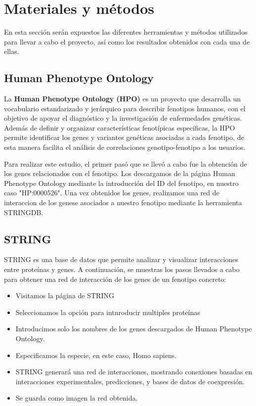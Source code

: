 \section{Materiales y métodos}

En esta sección serán expuestos las diferentes herramientas y métodos utilizados para llevar a cabo el proyecto, así como los resultados obtenidos con cada una de ellas.

\subsection{Human Phenotype Ontology}

La \textbf{Human Phenotype Ontology (HPO)} es un proyecto que desarrolla un vocabulario estandarizado y jerárquico para describir fenotipos humanos, con el objetivo de apoyar el diagnóstico y la investigación de enfermedades genéticas. Además de definir y organizar características fenotípicas específicas, la HPO permite identificar los genes y variantes genéticas asociadas a cada fenotipo, de esta manera facilita el análisis de correlaciones genotipo-fenotipo a los usuarios.

Para realizar este estudio, el primer pasó que se llevó a cabo fue la obtención de los genes relacionados con el fenotipo. Los descargamos de la página Human Phenotype Ontology mediante la introducción del ID del fenotipo, en nuestro caso "HP:0000526". Una vez obtenidos los genes, realizamos una red de interaccion de los genese asociados a nuestro fenotipo mediante la herramienta STRINGDB.
 

\subsection{STRING}


STRING es una base de datos que permite analizar y visualizar interacciones entre proteínas y genes. A continuación, se muestras los pasos llevados a cabo para obtener una red de interacción de los genes de un fenotipo concreto:

\begin{itemize}
	\item Visitamos la página de STRING
	\item Seleccionamos la opción para intnroducir multiples proteínas
	\item Introducimos solo los nombres de los genes descargados de Human Phenotype Ontology.
	\item Especificamos la especie, en este caso, Homo sapiens.
	\item STRING generará una red de interacciones, mostrando conexiones basadas en interacciones experimentales, predicciones, y bases de datos de coexpresión.
	\item Se guarda como imagen la red obtenida.
\end{itemize}

